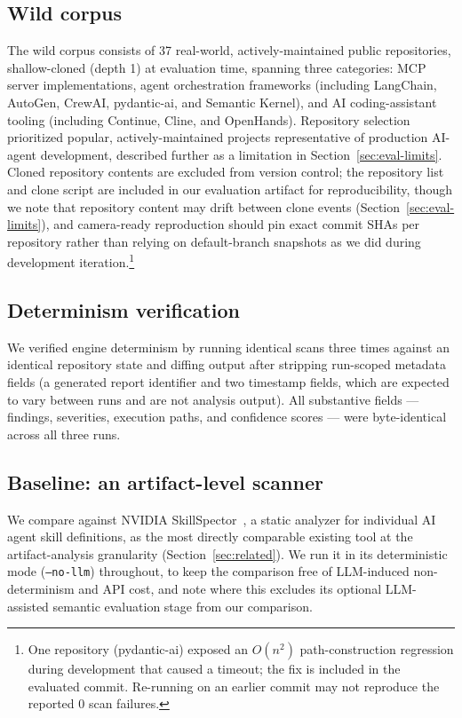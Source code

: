\documentclass[sigconf,anonymous,review]{acmart}
\begin{document}
\subsection{Wild corpus}
\label{sec:wild-corpus}
The wild corpus consists of 37 real-world, actively-maintained public repositories, shallow-cloned (depth 1) at evaluation time, spanning three categories: MCP server implementations, agent orchestration frameworks (including LangChain, AutoGen, CrewAI, pydantic-ai, and Semantic Kernel), and AI coding-assistant tooling (including Continue, Cline, and OpenHands). Repository selection prioritized popular, actively-maintained projects representative of production AI-agent development, described further as a limitation in Section~\ref{sec:eval-limits}. Cloned repository contents are excluded from version control; the repository list and clone script are included in our evaluation artifact for reproducibility, though we note that repository content may drift between clone events (Section~\ref{sec:eval-limits}), and camera-ready reproduction should pin exact commit SHAs per repository rather than relying on default-branch snapshots as we did during development iteration.\footnote{One repository (pydantic-ai) exposed an $O(n^2)$ path-construction regression during development that caused a timeout; the fix is included in the evaluated commit. Re-running on an earlier commit may not reproduce the reported 0 scan failures.}

\subsection{Determinism verification}
\label{sec:determinism}
We verified engine determinism by running identical scans three times against an identical repository state and diffing output after stripping run-scoped metadata fields (a generated report identifier and two timestamp fields, which are expected to vary between runs and are not analysis output). All substantive fields --- findings, severities, execution paths, and confidence scores --- were byte-identical across all three runs.

\subsection{Baseline: an artifact-level scanner}
\label{sec:baseline}
We compare against NVIDIA SkillSpector~\cite{skillspector}, a static analyzer for individual AI agent skill definitions, as the most directly comparable existing tool at the artifact-analysis granularity (Section~\ref{sec:related}). We run it in its deterministic mode (\texttt{--no-llm}) throughout, to keep the comparison free of LLM-induced non-determinism and API cost, and note where this excludes its optional LLM-assisted semantic evaluation stage from our comparison.
\end{document}
